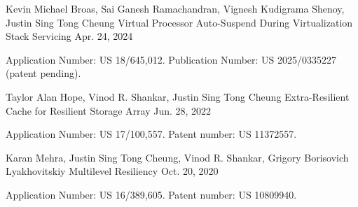 

\begin{cventries}

  \cventry
    {Kevin Michael Broas, Sai Ganesh Ramachandran, Vignesh Kudigrama Shenoy, Justin Sing Tong Cheung} %
    {Virtual Processor Auto-Suspend During Virtualization Stack Servicing}
    {}
    {Apr. 24, 2024} %
    {
      \begin{cvitems}
        \item {
          Application Number: US 18/645,012. Publication Number: US 2025/0335227 (patent pending).
        }
      \end{cvitems}
    }

  \cventry
    {Taylor Alan Hope, Vinod R. Shankar, Justin Sing Tong Cheung} %
    {Extra-Resilient Cache for Resilient Storage Array}
    {}
    {Jun. 28, 2022} %
    {
      \begin{cvitems}
        \item {
          Application Number: US 17/100,557. Patent number: US 11372557.
        }
      \end{cvitems}
    }

  \cventry
    {Karan Mehra, Justin Sing Tong Cheung, Vinod R. Shankar, Grigory Borisovich Lyakhovitskiy} %
    {Multilevel Resiliency}
    {}
    {Oct. 20, 2020} %
    {
      \begin{cvitems}
        \item {
          Application Number: US 16/389,605. Patent number: US 10809940.
        }
      \end{cvitems}
    }

\end{cventries}